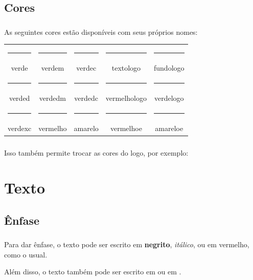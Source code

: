 \documentclass[aspectratio=169]{beamer}
\begin{document}
\subsection{Cores}

\begin{frame}[t]\frametitle{\secname}\framesubtitle{\subsecname}
  As seguintes cores estão disponíveis com seus próprios nomes:\\[1em]

  \begin{tabular}{ccccc}
    \color{verde}\rule{2cm}{1cm} & \color{verdem}\rule{2cm}{1cm} & \color{verdec}\rule{2cm}{1cm} & \color{textologo}\rule{2cm}{1cm} & \color{fundologo}\rule{2cm}{1cm} \\
    verde & verdem & verdec & textologo & fundologo \\[1em]
    \color{verded}\rule{2cm}{1cm} & \color{verdedm}\rule{2cm}{1cm} & \color{verdedc}\rule{2cm}{1cm} & \color{vermelhologo}\rule{2cm}{1cm} & \color{verdelogo}\rule{2cm}{1cm} \\
    verded & verdedm & verdedc & vermelhologo & verdelogo \\[1em]
    \color{verdexc}\rule{2cm}{1cm} & \color{vermelho}\rule{2cm}{1cm} & \color{amarelo}\rule{2cm}{1cm} & \color{vermelhoe}\rule{2cm}{1cm} & \color{amareloe}\rule{2cm}{1cm}\\
    verdexc & vermelho & amarelo & vermelhoe & amareloe 
  \end{tabular}
\end{frame}

\begin{frame}[t]\frametitle{\secname}\framesubtitle{\subsecname}
  Isso também permite trocar as cores do logo, por exemplo:

  \begingroup
    \inserttitlegraphic
  \endgroup
  \inserttitlegraphic
\end{frame}

\section{Texto}

\subsection{Ênfase}

\begin{frame}[t]\frametitle{\secname}\framesubtitle{\subsecname}
  Para dar ênfase, o texto pode ser escrito em \textbf{negrito}, \emph{itálico}, ou em \alert{vermelho}, como o usual.

  Além disso, o texto também pode ser escrito em  ou em .
\end{frame}
\end{document}
